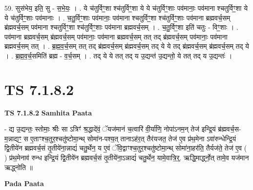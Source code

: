 \documentclass[17pt]{extarticle}
\begin{document}
59. सुस॑भेय॒ इति॒ सु - स॒भे॒यः॒ । . ये च॑तुर्विꣳ॒॒शा श्च॑तुर्विꣳ॒॒शा ये ये च॑तुर्विꣳ॒॒शाः पव॑मानाः॒ पव॑माना श्चतुर्विꣳ॒॒शा ये ये च॑तुर्विꣳ॒॒शाः पव॑मानाः । . च॒तु॒र्विꣳ॒॒शाः पव॑मानाः॒ पव॑माना श्चतुर्विꣳ॒॒शा श्च॑तुर्विꣳ॒॒शाः पव॑माना ब्रह्मवर्च॒सम् ब्र॑ह्मवर्च॒सम् पव॑माना श्चतुर्विꣳ॒॒शा श्च॑तुर्विꣳ॒॒शाः पव॑माना ब्रह्मवर्च॒सम् । . च॒तु॒र्विꣳ॒॒शा इति॑ चतुः - विꣳ॒॒शाः । . पव॑माना ब्रह्मवर्च॒सम् ब्र॑ह्मवर्च॒सम् पव॑मानाः॒ पव॑माना ब्रह्मवर्च॒सम् तत् तद् ब्र॑ह्मवर्च॒सम् पव॑मानाः॒ पव॑माना ब्रह्मवर्च॒सम् तत् । . ब्र॒ह्म॒व॒र्च॒सम् तत् तद् ब्र॑ह्मवर्च॒सम् ब्र॑ह्मवर्च॒सम् तद् ये ये तद् ब्र॑ह्मवर्च॒सम् ब्र॑ह्मवर्च॒सम् तद् ये । . ब्र॒ह्म॒व॒र्च॒समिति॑ ब्रह्म - व॒र्च॒सम् । . तद् ये ये तत् तद् य उ॒द्यन्त॑ उ॒द्यन्तो॒ ये तत् तद् य उ॒द्यन्तः॑ । \newline
\pagebreak
{}

\section{ TS 7.1.8.2 }

\textbf{TS 7.1.8.2 } \newline
\textbf{Samhita Paata} \newline

- द्य उ॒द्यन्तः॒ स्तोमाः॒ श्रीः सा ऽत्रिꣳ॑ श्र॒द्धादे॑वं॒ ॅयज॑मानं च॒त्वारि॑ वी॒र्या॑णि॒ नोपा॑ऽनम॒न् तेज॑ इन्द्रि॒यं ब्र॑ह्मवर्च॒स-म॒न्नाद्यꣳ॒॒ स ए॒ताꣳश्च॒तुर॒श्चतु॑ष्टोमा॒न्थ् सोमा॑न-पश्य॒त् तानाऽह॑र॒त् तैर॑यजत॒ तेज॑ ए॒व प्र॑थ॒मेना ऽवा॑रुन्धेन्द्रि॒यं द्वि॒तीये॑न ब्रह्मवर्च॒सं तृ॒तीये॑ना॒न्नाद्यं॑ चतु॒र्थेन॒ य ए॒वं ॅवि॒द्वाꣳश्च॒तुर॒श्चतु॑ष्टोमा॒न्थ् सोमा॑ना॒हर॑ति॒ तैर्यज॑ते॒ तेज॑ ए॒व ( ) प्र॑थ॒मेनाव॑ रुन्ध इन्द्रि॒यं द्वि॒तीये॑न ब्रह्मवर्च॒सं तृ॒तीये॑ना॒ऽन्नाद्यं॑ चतु॒र्थेन॒ यामे॒वात्रि॒र्॒. ऋद्धि॒मार्द्ध्नो॒त् तामे॒व यज॑मान ऋद्ध्नोति ॥ \newline

\textbf{Pada Paata} \newline
\end{document}
